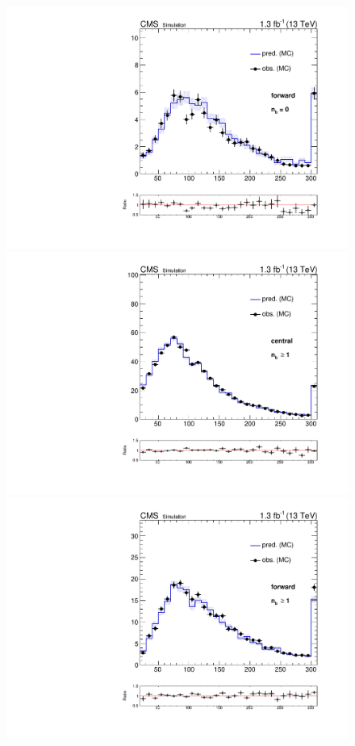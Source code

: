 \begin{figure}[htb]
\begin{center}
    \includegraphics[scale=0.30]{bkgd/figs/plot_results_mll_MCClosure_forward_onlyTT_nb0.pdf} \\
    \includegraphics[scale=0.30]{bkgd/figs/plot_results_mll_MCClosure_central_onlyTT_nb1.pdf}
    \includegraphics[scale=0.30]{bkgd/figs/plot_results_mll_MCClosure_forward_onlyTT_nb1.pdf}\\

\end{center}
\end{figure}
